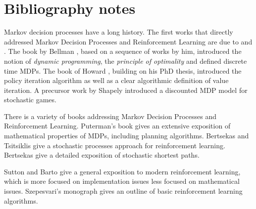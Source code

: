 \section{Bibliography notes}

Markov decision processes have a long history. The first works that directly addressed Markov Decision Processes and Reinforcement Learning are due to \cite{Bellman:DynamicProgramming} and \cite{Howard1960}. The book by Bellman \cite{Bellman:DynamicProgramming}, based on a sequence of works by him, introduced the notion of \emph{dynamic programming}, the \emph{principle of optimality} and defined discrete time MDPs. The book of Howard \cite{Howard1960}, building on his PhD thesis, introduced the policy iteration algorithm as well as a clear algorithmic definition of value iteration. A precursor work by Shapely \cite{Shapley53} introduced a discounted MDP model for stochastic games.

There is a variety of books addressing Markov Decision Processes and Reinforcement Learning. Puterman's book \cite{puterman2014markov} gives an extensive exposition of mathematical properties of MDPs, including planning algorithms. Bertsekas and Tsitsiklis \cite{BertsekasTsitsiklis96} give a stochastic processes approach for reinforcement learning. Bertsekas \cite{Bertsekas05} give a detailed exposition of stochastic shortest paths.

Sutton and Barto \cite{SuttonB98} give a general exposition to modern reinforcement learning, which is more focused on implementation issues less focused on mathematical issues. Szepesvari's monograph \cite{Szepesvari} gives an outline of basic reinforcement learning algorithms.



